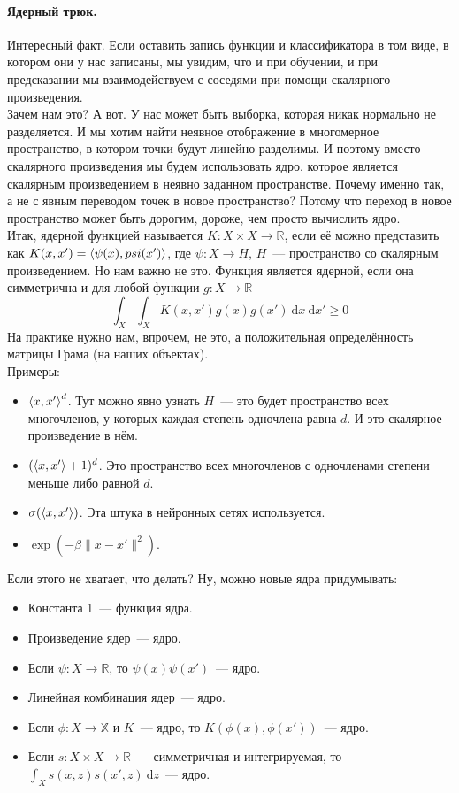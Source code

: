\documentclass{article}
\begin{document}
    \paragraph{Ядерный трюк.}
    Интересный факт. Если оставить запись функции и классификатора в том виде, в котором они у нас записаны, мы увидим, что и при обучении, и при предсказании мы взаимодействуем с соседями при помощи скалярного произведения.\\
    Зачем нам это? А вот. У нас может быть выборка, которая никак нормально не разделяется. И мы хотим найти неявное отображение в многомерное пространство, в котором точки будут линейно разделимы. И поэтому вместо скалярного произведения мы будем использовать ядро, которое является скалярным произведением в неявно заданном пространстве. Почему именно так, а не с явным переводом точек в новое пространство? Потому что переход в новое пространство может быть дорогим, дороже, чем просто вычислить ядро.\\
    Итак, ядерной функцией называется $K\colon X\times X\to\mathbb R$, если её можно представить как $K(x,x')={\left\langle{\psi(x)},{psi(x')}\right\rangle}$, где $\psi\colon X\to H$, $H$~--- пространство со скалярным произведением. Но нам важно не это. Функция является ядерной, если она симметрична и для любой функции $g\colon X\to\mathbb R$
    \[
    \int_X\int_XK(x,x')g(x)g(x')~\mathrm dx~\mathrm dx'\geqslant0
    \]
    На практике нужно нам, впрочем, не это, а положительная определённость матрицы Грама (на наших объектах).\\
    Примеры:
    \begin{itemize}
        \item ${\left\langle{x},{x'}\right\rangle}^d$. Тут можно явно узнать $H$~--- это будет пространство всех многочленов, у которых каждая степень одночлена равна $d$. И это скалярное произведение в нём.
        \item $({\left\langle{x},{x'}\right\rangle}+1)^d$. Это пространство всех многочленов с одночленами степени меньше либо равной $d$.
        \item $\sigma({\left\langle{x},{x'}\right\rangle})$. Эта штука в нейронных сетях используется.
        \item $\exp(-\beta\|x-x'\|^2)$.
    \end{itemize}
    Если этого не хватает, что делать? Ну, можно новые ядра придумывать:
    \begin{itemize}
        \item Константа 1~--- функция ядра.
        \item Произведение ядер~--- ядро.
        \item Если $\psi\colon X\to\mathbb R$, то $\psi(x)\psi(x')$~--- ядро.
        \item Линейная комбинация ядер~--- ядро.
        \item Если $\phi\colon X\to\mathbb X$ и $K$~--- ядро, то $K(\phi(x),\phi(x'))$~--- ядро.
        \item Если $s\colon X\times X\to\mathbb R$~--- симметричная и интегрируемая, то $\int_Xs(x,z)s(x',z)~\mathrm dz$~--- ядро.
    \end{itemize}
\end{document}
